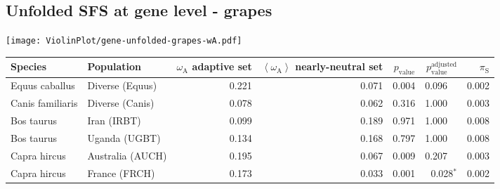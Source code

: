 \subsection{Unfolded SFS at gene level - grapes} 
\begin{center}
\texttt{[image: ViolinPlot/gene-unfolded-grapes-wA.pdf]} 
\begin{adjustbox}{width = 1\textwidth}
\begin{tabular}{|l|l|r|r|r|r|r|}
\toprule
             Species &                      Population & \specialcell{$\omega_{\mathrm{A}}$ \\ adaptive set} & \specialcell{$\left< \omega_{\mathrm{A}} \right>$ \\ nearly-neutral set} & $p_{\mathrm{value}}$ & $p_{\mathrm{value}}^{\mathrm{adjusted}}$ & $\pi_{\textrm{S}}$ \\
\midrule
      Equus caballus &                 Diverse (Equus) &                                              0.221 &                                              0.071 &                0.004 &                                  0.096~~ &              0.002 \\
    Canis familiaris &                 Diverse (Canis) &                                              0.078 &                                              0.062 &                0.316 &                                  1.000~~ &              0.003 \\
          Bos taurus &                     Iran (IRBT) &                                              0.099 &                                              0.189 &                0.971 &                                  1.000~~ &              0.008 \\
          Bos taurus &                   Uganda (UGBT) &                                              0.134 &                                              0.168 &                0.797 &                                  1.000~~ &              0.008 \\
        Capra hircus &                Australia (AUCH) &                                              0.195 &                                              0.067 &                0.009 &                                  0.207~~ &              0.003 \\
        Capra hircus &                   France (FRCH) &                                              0.173 &                                              0.033 &                0.001 &                           0.028$\bm{^*}$ &              0.002 \\

\end{tabular}
\end{adjustbox}
\end{center}
